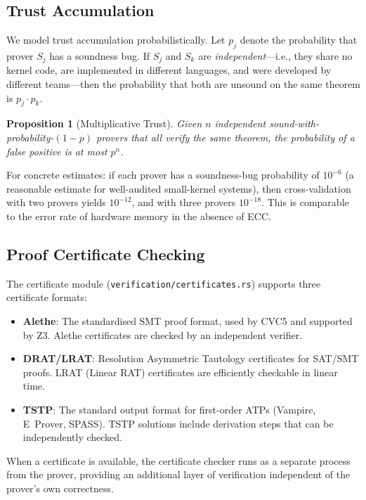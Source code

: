 \documentclass[11pt,a4paper]{article}
\newtheorem{proposition}[theorem]{Proposition}
\begin{document}
\subsection{Trust Accumulation}

We model trust accumulation probabilistically. Let $p_j$ denote the
probability that prover $S_j$ has a soundness bug. If $S_j$ and $S_k$ are
\emph{independent}---i.e., they share no kernel code, are implemented in
different languages, and were developed by different teams---then the
probability that both are unsound on the same theorem is $p_j \cdot p_k$.

\begin{proposition}[Multiplicative Trust]
\label{prop:mult-trust}
Given $n$ independent sound-with-probability-$(1-p)$ provers that all
verify the same theorem, the probability of a false positive is at most $p^n$.
\end{proposition}

For concrete estimates: if each prover has a soundness-bug probability of
$10^{-6}$ (a reasonable estimate for well-audited small-kernel systems), then
cross-validation with two provers yields $10^{-12}$, and with three provers
$10^{-18}$. This is comparable to the error rate of hardware memory in the
absence of ECC.

\subsection{Proof Certificate Checking}

The certificate module (\texttt{verification/certificates.rs}) supports three
certificate formats:

\begin{itemize}
  \item \textbf{Alethe}: The standardised SMT proof format, used by CVC5 and
  supported by Z3. Alethe certificates are checked by an independent
  verifier.

  \item \textbf{DRAT/LRAT}: Resolution Asymmetric Tautology certificates for
  SAT/SMT proofs. LRAT (Linear RAT) certificates are efficiently checkable
  in linear time.

  \item \textbf{TSTP}: The standard output format for first-order ATPs
  (Vampire, E~Prover, SPASS). TSTP solutions include derivation steps that
  can be independently checked.
\end{itemize}

When a certificate is available, the certificate checker runs as a separate
process from the prover, providing an additional layer of verification
independent of the prover's own correctness.
\end{document}

